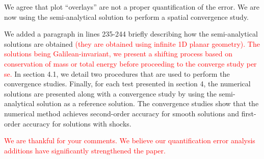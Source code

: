 \documentclass{article}
\newcommand{\tcr}[1]{\textcolor{red}{#1}}
\begin{document}
We agree that plot "`overlays"' are not a proper quantification of the error. We are now using the semi-analytical solution to perform a spatial convergence study.

We added a paragraph in lines 235-244 briefly describing how the semi-analytical solutions are obtained
\tcr{
(they are obtained using infinite 1D planar geometry). The solutions being Galilean-invariant, we present a shifting
process based on conservation of mass or total energy before proceeding to the converge study per se. 
}
In section 4.1, we detail two procedures that are used to perform the convergence studies. Finally, for each test presented in section 4, the numerical solutions are presented along with a convergence study by using the semi-analytical solution as a reference solution. The convergence studies show that the numerical method achieves second-order accuracy for smooth solutions and first-order accuracy for solutions with shocks. 

\tcr{We are thankful for your comments. We believe our quantification error analysis additions have significantly strengthened the paper.}

\bigskip
\end{document}
